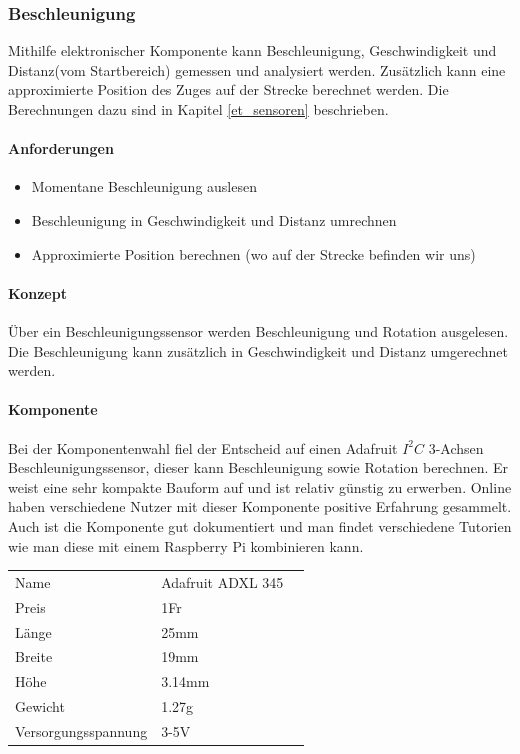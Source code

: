 \documentclass[../../main.tex]{subfiles}
\begin{document}
\subsubsection{Beschleunigung} \label{pi_beschleunigung}
Mithilfe elektronischer Komponente kann Beschleunigung, Geschwindigkeit und Distanz(vom Startbereich) gemessen und analysiert werden. Zusätzlich kann eine approximierte Position des Zuges auf der Strecke berechnet werden. Die Berechnungen dazu sind in Kapitel \ref{et_sensoren} beschrieben.

\paragraph{Anforderungen}
\begin{itemize}
    \item Momentane Beschleunigung auslesen
    \item Beschleunigung in Geschwindigkeit und Distanz umrechnen
    \item Approximierte Position berechnen (wo auf der Strecke befinden wir uns)
\end{itemize}

\paragraph{Konzept}
Über ein Beschleunigungssensor werden Beschleunigung und Rotation ausgelesen. Die Beschleunigung kann zusätzlich in Geschwindigkeit und Distanz umgerechnet werden.

\paragraph{Komponente}
Bei der Komponentenwahl fiel der Entscheid auf einen Adafruit $I^2C$ 3-Achsen Beschleunigungssensor, dieser kann Beschleunigung sowie Rotation berechnen. Er weist eine sehr kompakte Bauform auf und ist relativ günstig zu erwerben. Online haben verschiedene Nutzer mit dieser Komponente positive Erfahrung gesammelt. Auch ist die Komponente gut dokumentiert und man findet verschiedene Tutorien wie man diese mit einem Raspberry Pi kombinieren kann.

\begin{table}[] \centering
\begin{tabular}{lll}
Name & Adafruit ADXL 345 \\
Preis & 1Fr    \\
Länge & 25mm    \\
Breite & 19mm   \\
Höhe & 3.14mm   \\
Gewicht & 1.27g   \\
Versorgungsspannung & 3-5V \\
\end{tabular}
\end{table}
\end{document}

